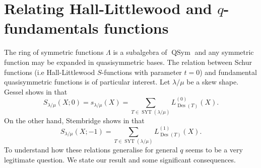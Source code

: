 \documentclass[revision]{FPSAC2024}
\newcommand{\la}{\lambda}
\newcommand{\QSym}{\operatorname{QSym}}
\newcommand{\SYT}{\operatorname{SYT}}
\newcommand{\Des}{\operatorname{Des}}
\begin{document}
\section{Relating Hall-Littlewood and $q$-fundamentals functions}
The ring of symmetric functions $\Lambda$ is a subalgebra of $\QSym$ and any symmetric function may be expanded in quasisymmetric bases. The relation between Schur functions (i.e Hall-Littlewood $S$-functions with parameter $t=0$) and fundamental quasisymmetric functions is of particular interest. Let $\la /\mu$ be a skew shape. Gessel shows in \cite{Ges84} that
\begin{equation}
\label{equation.S0L}
S_{\la/\mu}(X; 0) = s_{\la/\mu}(X) = \sum_{T \in \SYT(\la/\mu)}L^{(0)}_{\Des(T)}(X).
\end{equation}
On the other hand, Stembridge shows in \cite{Ste97} that
\begin{equation}
\label{equation.S1L}
S_{\la/\mu}(X; -1) = \sum_{T \in \SYT(\la/\mu)}L^{(1)}_{\Des(T)}(X).
\end{equation}
To understand how these relations generalise for general $q$ seems to be a very legitimate question. We state our result and  some significant consequences. 
\end{document}

